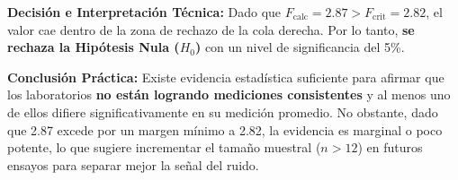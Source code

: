 \documentclass[10pt,a4paper]{article}
\begin{document}
\textbf{Decisión e Interpretación Técnica:} Dado que $F_{\text{calc}}=2.87 > F_{\text{crit}}=2.82$, el valor cae dentro de la zona de rechazo de la cola derecha. Por lo tanto, \textbf{se rechaza la Hipótesis Nula ($H_0$)} con un nivel de significancia del 5\%.

\textbf{Conclusión Práctica:} Existe evidencia estadística suficiente para afirmar que los laboratorios \textbf{no están logrando mediciones consistentes} y al menos uno de ellos difiere significativamente en su medición promedio. No obstante, dado que 2.87 excede por un margen mínimo a 2.82, la evidencia es marginal o poco potente, lo que sugiere incrementar el tamaño muestral ($n>12$) en futuros ensayos para separar mejor la señal del ruido.
\end{document}
